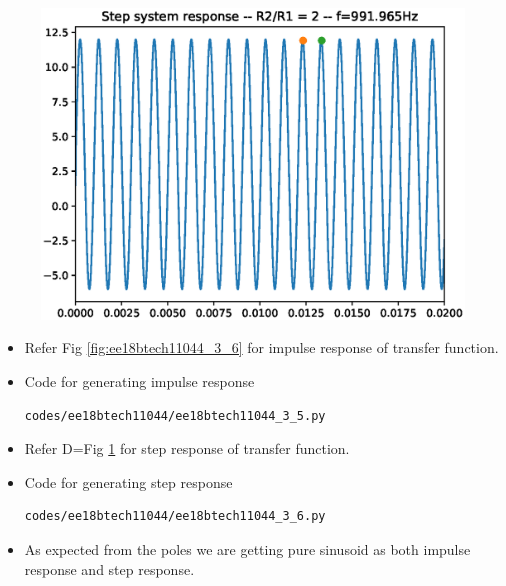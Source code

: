 \begin{enumerate}[label=\arabic*.,ref=\theenumi]
\begin{figure}[!ht]
\centering
\includegraphics[width=\columnwidth]{./figs/ee18btech11044/ee18btech11044_3_7.eps}
\caption{}
\label{fig:ee18btech11044_3_7}
\end{figure}

\renewcommand{\thefigure}{\theenumi}

\solution

\begin{itemize}
\item Refer Fig \ref{fig:ee18btech11044_3_6} for impulse response of transfer function.
\item Code for generating impulse response
\begin{lstlisting}
codes/ee18btech11044/ee18btech11044_3_5.py
\end{lstlisting}
\item Refer D=Fig \ref{fig:ee18btech11044_3_7} for step response of transfer function.
\item Code for generating step response
\begin{lstlisting}
codes/ee18btech11044/ee18btech11044_3_6.py
\end{lstlisting}
\item As expected from the poles we are getting pure sinusoid as both impulse response and step response.
\end{itemize}



\end{enumerate}
